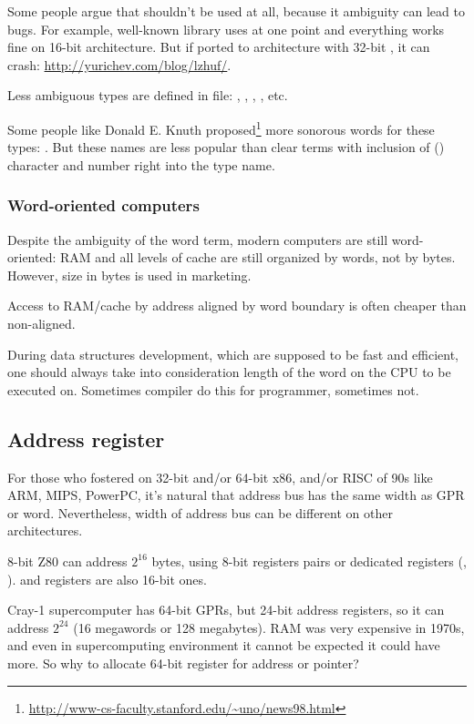 Some people argue that  shouldn't be used at all, because it ambiguity can lead to bugs.
For example, well-known  library uses  at one point and everything works fine on 16-bit architecture.
But if ported to architecture with 32-bit , it can crash: \url{http://yurichev.com/blog/lzhuf/}.

Less ambiguous types are defined in  file:
, , , , etc.

Some people like Donald E. Knuth proposed\footnote{\url{http://www-cs-faculty.stanford.edu/~uno/news98.html}}
more sonorous words
for these types: .
But these names are less popular than clear terms with inclusion of  () character 
and number right into the type name.

\subsubsection{Word-oriented computers}

Despite the ambiguity of the \gls{word} term, modern computers are still word-oriented: \ac{RAM} and all levels of cache
are still organized by words, not by bytes.
However, size in bytes is used in marketing.

Access to RAM/cache by address aligned by word boundary is often cheaper than non-aligned.

During data structures development, which are supposed to be fast and efficient,
one should always take into consideration length of the \gls{word} on the CPU to be executed on.
Sometimes compiler do this for programmer, sometimes not.

\subsection{Address register}

For those who fostered on 32-bit and/or 64-bit x86, and/or RISC of 90s like ARM, MIPS, PowerPC, it's natural that
address bus has the same width as \ac{GPR} or \gls{word}.
Nevertheless, width of address bus can be different on other architectures.

8-bit Z80 can address $2^{16}$ bytes, using 8-bit registers pairs or dedicated registers (, ).
 and  registers are also 16-bit ones.

Cray-1 supercomputer has 64-bit GPRs, but 24-bit address registers, so it can address $2^{24}$ 
(16 megawords or 128 megabytes).
RAM was very expensive in 1970s, and even in supercomputing environment it cannot be expected it could have more.
So why to allocate 64-bit register for address or pointer?

